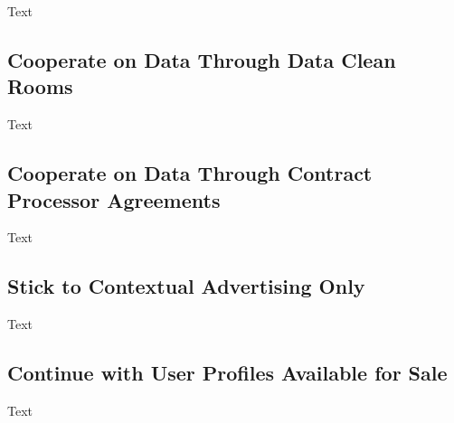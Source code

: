 Text

\subsection{Cooperate on Data Through Data Clean Rooms}

Text

\subsection{Cooperate on Data Through Contract Processor Agreements}

Text

\subsection{Stick to Contextual Advertising Only}

Text

\subsection{Continue with User Profiles Available for Sale}

Text

